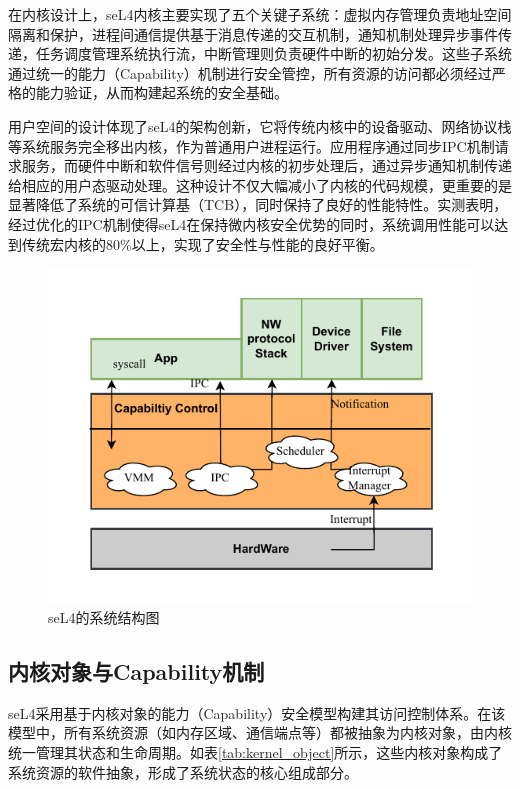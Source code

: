在内核设计上，seL4内核主要实现了五个关键子系统：虚拟内存管理负责地址空间隔离和保护，进程间通信提供基于消息传递的交互机制，通知机制处理异步事件传递，任务调度管理系统执行流，中断管理则负责硬件中断的初始分发。这些子系统通过统一的能力（Capability）机制进行安全管控\cite{klein2014comprehensive}，所有资源的访问都必须经过严格的能力验证，从而构建起系统的安全基础。

用户空间的设计体现了seL4的架构创新，它将传统内核中的设备驱动、网络协议栈等系统服务完全移出内核，作为普通用户进程运行。应用程序通过同步IPC机制请求服务，而硬件中断和软件信号则经过内核的初步处理后，通过异步通知机制传递给相应的用户态驱动处理。这种设计不仅大幅减小了内核的代码规模，更重要的是显著降低了系统的可信计算基（TCB）\cite{de2024sel4}，同时保持了良好的性能特性。实测表明，经过优化的IPC机制使得seL4在保持微内核安全优势的同时，系统调用性能可以达到传统宏内核的80\%\cite{heiser2016l4}以上，实现了安全性与性能的良好平衡。

\begin{figure}[htbp]
  \centering
  \includegraphics[width=1\textwidth]{figures/seL4_framwork.drawio.pdf}
  \caption{seL4的系统结构图}\label{fig:seL4_frramework}
\end{figure}

\subsection{内核对象与Capability机制}
seL4采用基于内核对象的能力（Capability）安全模型构建其访问控制体系。在该模型中，所有系统资源（如内存区域、通信端点等）都被抽象为内核对象，由内核统一管理其状态和生命周期。如表\ref{tab:kernel_object}所示，这些内核对象构成了系统资源的软件抽象，形成了系统状态的核心组成部分。

